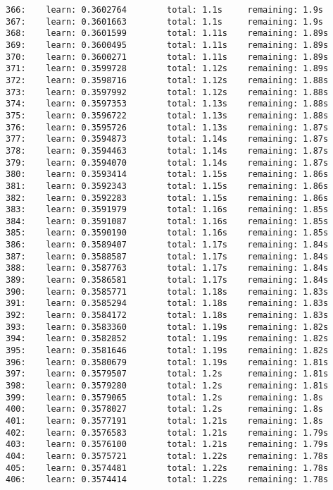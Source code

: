 \documentclass[11pt]{article}
\begin{document}
\begin{Verbatim}[commandchars=\\\{\}]
366:    learn: 0.3602764        total: 1.1s     remaining: 1.9s
367:    learn: 0.3601663        total: 1.1s     remaining: 1.9s
368:    learn: 0.3601599        total: 1.11s    remaining: 1.89s
369:    learn: 0.3600495        total: 1.11s    remaining: 1.89s
370:    learn: 0.3600271        total: 1.11s    remaining: 1.89s
371:    learn: 0.3599728        total: 1.12s    remaining: 1.89s
372:    learn: 0.3598716        total: 1.12s    remaining: 1.88s
373:    learn: 0.3597992        total: 1.12s    remaining: 1.88s
374:    learn: 0.3597353        total: 1.13s    remaining: 1.88s
375:    learn: 0.3596722        total: 1.13s    remaining: 1.88s
376:    learn: 0.3595726        total: 1.13s    remaining: 1.87s
377:    learn: 0.3594873        total: 1.14s    remaining: 1.87s
378:    learn: 0.3594463        total: 1.14s    remaining: 1.87s
379:    learn: 0.3594070        total: 1.14s    remaining: 1.87s
380:    learn: 0.3593414        total: 1.15s    remaining: 1.86s
381:    learn: 0.3592343        total: 1.15s    remaining: 1.86s
382:    learn: 0.3592283        total: 1.15s    remaining: 1.86s
383:    learn: 0.3591979        total: 1.16s    remaining: 1.85s
384:    learn: 0.3591087        total: 1.16s    remaining: 1.85s
385:    learn: 0.3590190        total: 1.16s    remaining: 1.85s
386:    learn: 0.3589407        total: 1.17s    remaining: 1.84s
387:    learn: 0.3588587        total: 1.17s    remaining: 1.84s
388:    learn: 0.3587763        total: 1.17s    remaining: 1.84s
389:    learn: 0.3586581        total: 1.17s    remaining: 1.84s
390:    learn: 0.3585771        total: 1.18s    remaining: 1.83s
391:    learn: 0.3585294        total: 1.18s    remaining: 1.83s
392:    learn: 0.3584172        total: 1.18s    remaining: 1.83s
393:    learn: 0.3583360        total: 1.19s    remaining: 1.82s
394:    learn: 0.3582852        total: 1.19s    remaining: 1.82s
395:    learn: 0.3581646        total: 1.19s    remaining: 1.82s
396:    learn: 0.3580679        total: 1.19s    remaining: 1.81s
397:    learn: 0.3579507        total: 1.2s     remaining: 1.81s
398:    learn: 0.3579280        total: 1.2s     remaining: 1.81s
399:    learn: 0.3579065        total: 1.2s     remaining: 1.8s
400:    learn: 0.3578027        total: 1.2s     remaining: 1.8s
401:    learn: 0.3577191        total: 1.21s    remaining: 1.8s
402:    learn: 0.3576583        total: 1.21s    remaining: 1.79s
403:    learn: 0.3576100        total: 1.21s    remaining: 1.79s
404:    learn: 0.3575721        total: 1.22s    remaining: 1.78s
405:    learn: 0.3574481        total: 1.22s    remaining: 1.78s
406:    learn: 0.3574414        total: 1.22s    remaining: 1.78s

\end{Verbatim}
\end{document}
